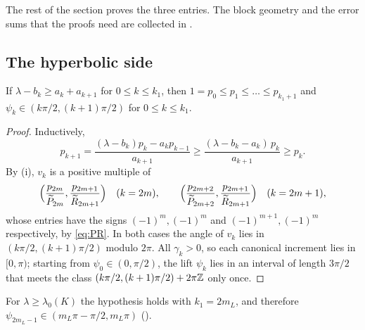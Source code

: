 %

The rest of the section proves the three entries. The block geometry and the error sums
that the proofs need are collected in .

\subsection{The hyperbolic side}

\begin{lemma}\label{lem:hyperbolic}
If $\lambda-b_k\ge a_k+a_{k+1}$ for $0\le k\le k_1$, then
$1=p_0\le p_1\le\dots\le p_{k_1+1}$ and $\psi_k\in(k\pi/2,(k+1)\pi/2)$ for $0\le k\le k_1$.
\end{lemma}

\begin{proof}
Inductively,
\[
  p_{k+1}=\frac{(\lambda-b_k)p_k-a_kp_{k-1}}{a_{k+1}}\ge\frac{(\lambda-b_k-a_k)\,p_k}{a_{k+1}}\ge p_k .
\]
By (i), $v_k$ is a positive multiple of
\[
  \Bigl(\frac{p_{2m}}{\widetilde P_{2m}},\frac{p_{2m+1}}{\widetilde R_{2m+1}}\Bigr)\quad(k=2m),\qquad
  \Bigl(\frac{p_{2m+2}}{\widetilde P_{2m+2}},\frac{p_{2m+1}}{\widetilde R_{2m+1}}\Bigr)\quad(k=2m+1),
\]
whose entries have the signs $(-1)^m,(-1)^m$ and $(-1)^{m+1},(-1)^m$ respectively, by \eqref{eq:PR}. In
both cases the angle of $v_k$ lies in $(k\pi/2,(k+1)\pi/2)$ modulo $2\pi$. All
$\gamma_k>0$, so each canonical increment lies in $[0,\pi)$; starting from
$\psi_0\in(0,\pi/2)$, the lift $\psi_k$ lies in an interval of length $3\pi/2$ that meets
the class $(k\pi/2,(k+1)\pi/2)+2\pi\mathbb{Z}$ only once.
\end{proof}

\noindent For $\lambda\ge\lambda_0(K)$ the hypothesis holds with $k_1=2m_L$, and therefore
$\psi_{2m_L-1}\in(m_L\pi-\pi/2,m_L\pi)$ ().

